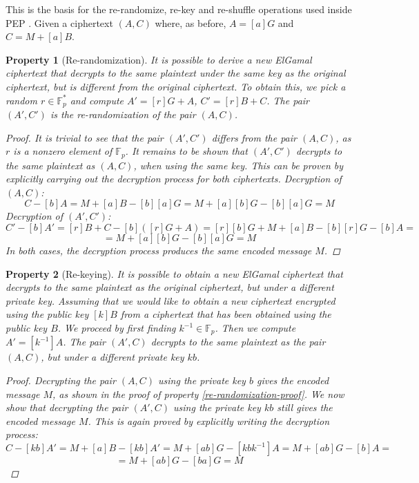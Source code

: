 \documentclass{report}
\newtheorem{property}{Property}
\begin{document}
This is the basis for the re-randomize, re-key and re-shuffle operations used inside PEP \cite{peppaper}.
\newline \newline
Given a ciphertext $(A, C)$ where, as before, $A=[a]G$ and $C=M+[a]B$.
\begin{property}[Re-randomization] It is possible to derive a new ElGamal ciphertext that decrypts to the same plaintext under the same key as the original ciphertext, but is different
from the original ciphertext. To obtain this, we pick a random $r \in \mathds{F}^*_p$ and compute $A'=[r]G+A$, $C'=[r]B+C$. The pair $(A', C')$ is the re-randomization of the pair $(A, C)$. \newline
\begin{proof} \label{re-randomization-proof}
		It is trivial to see that the pair $(A', C')$ differs from the pair $(A, C)$, as $r$ is a nonzero element of $\mathds{F}_p$. It remains to be shown that $(A', C')$ decrypts
		to the same plaintext as $(A, C)$, when using the same key. This can be proven by explicitly carrying out the decryption process for both ciphertexts. \newline
		\textit{Decryption of $(A, C)$:} \newline
		$$C-[b]A=M+[a]B-[b][a]G=M+[a][b]G-[b][a]G=M$$
\newline
		\textit{Decryption of $(A', C')$:} \newline
		$$C'-[b]A'=[r]B+C-[b]([r]G+A)=[r][b]G+M+[a]B-[b][r]G-[b]A=$$
		$$=M+[a][b]G-[b][a]G=M$$
\newline \newline
In both cases, the decryption process produces the same encoded message $M$.
\end{proof}
\end{property}

\begin{property}[Re-keying] It is possible to obtain a new ElGamal ciphertext that decrypts to the same plaintext as the original ciphertext, but under a different private key. Assuming
that we would like to obtain a new ciphertext encrypted using the public key $[k]B$ from a ciphertext that has been obtained using the public key $B$. We proceed by first
finding $k^{-1} \in \mathds{F}_p$. Then we compute $A'=[k^{-1}]A$. The pair $(A', C)$ decrypts to the same plaintext as the pair $(A, C)$, but under a different private key $kb$.
\newline
\begin{proof}
		Decrypting the pair $(A, C)$ using the private key $b$ gives the encoded message $M$, as shown in the proof of property \ref{re-randomization-proof}. We now show that decrypting the
		pair $(A', C)$ using the private key $kb$ still gives the encoded message $M$. This is again proved by explicitly writing the decryption process:
		$$C-[kb]A'=M+[a]B-[kb]A'=M+[ab]G-[kbk^{-1}]A=M+[ab]G-[b]A=$$
		$$=M+[ab]G-[ba]G=M$$
\end{proof}
\end{property}
\end{document}
